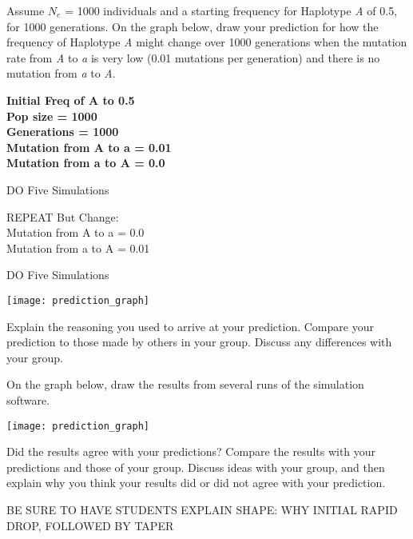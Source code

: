 \documentclass[11pt, addpoints]{exam}
\begin{document}
\begin{questions}

\question
Assume $N_e$ = 1000 individuals and a
starting frequency for Haplotype \emph{A} of 0.5, for 1000 generations. On the graph below,
draw your prediction for how the frequency of Haplotype \emph{A} might
change over 1000 generations when the mutation rate from \emph{A} to \emph{a} is very low
(0.01 mutations per generation) and there is no mutation from \emph{a}
to \emph{A}. 

\ifprintanswers
	{\bfseries Initial Freq of A to 0.5 \\	
	Pop size = 1000\\	
	Generations = 1000\\
	Mutation from A to a = 0.01\\
	Mutation from a to A = 0.0

	DO Five Simulations
	
	\vspace{\baselineskip}
	
	REPEAT But Change:\\	
	Mutation from A to a = 0.0\\
	Mutation from a to A = 0.01
	
	DO Five Simulations}\vspace{9\baselineskip}
\else
		\begin{center}
			\texttt{[image: prediction\_graph]}
		\end{center}
\fi

\question[2]
Explain the reasoning you used to arrive at your
prediction. Compare your prediction to those made by others in your
group. Discuss any differences with your group.%

\newpage

\question On the graph below, draw the results from several runs of
the simulation software.

\begin{center}
	\texttt{[image: prediction\_graph]}
\end{center}

\question
Did the results agree with your predictions? Compare the
results with your predictions and those of your group. Discuss ideas
with your group, and then explain why you think your results did or did
not agree with your prediction.%

\begin{solution}
BE SURE TO HAVE STUDENTS EXPLAIN SHAPE: WHY INITIAL RAPID DROP, FOLLOWED BY TAPER


\end{solution}
\end{questions}
\end{document}
